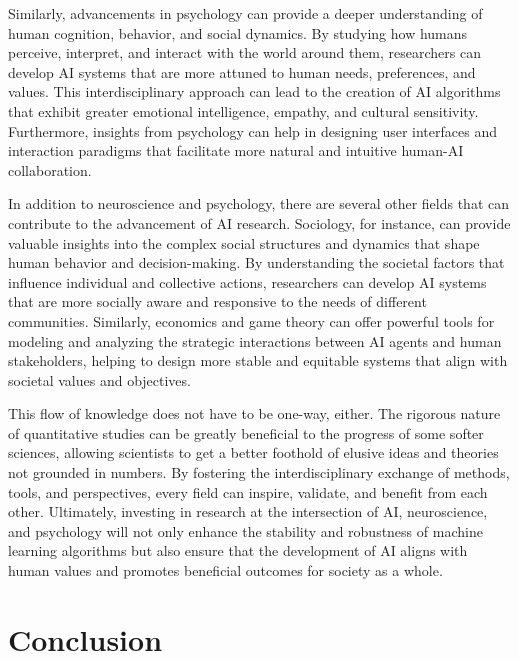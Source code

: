 \documentclass[10pt]{article}
\begin{document}
    Similarly, advancements in psychology can provide a deeper understanding of human cognition, behavior, and social dynamics. By studying how humans perceive, interpret, and interact with the world around them, researchers can develop AI systems that are more attuned to human needs, preferences, and values. This interdisciplinary approach can lead to the creation of AI algorithms that exhibit greater emotional intelligence, empathy, and cultural sensitivity. Furthermore, insights from psychology can help in designing user interfaces and interaction paradigms that facilitate more natural and intuitive human-AI collaboration.

    In addition to neuroscience and psychology, there are several other fields that can contribute to the advancement of AI research. Sociology, for instance, can provide valuable insights into the complex social structures and dynamics that shape human behavior and decision-making. By understanding the societal factors that influence individual and collective actions, researchers can develop AI systems that are more socially aware and responsive to the needs of different communities. Similarly, economics and game theory can offer powerful tools for modeling and analyzing the strategic interactions between AI agents and human stakeholders, helping to design more stable and equitable systems that align with societal values and objectives.

    This flow of knowledge does not have to be one-way, either. The rigorous nature of quantitative studies can be greatly beneficial to the progress of some softer sciences, allowing scientists to get a better foothold of elusive ideas and theories not grounded in numbers. By fostering the interdisciplinary exchange of methods, tools, and perspectives, every field can inspire, validate, and benefit from each other. Ultimately, investing in research at the intersection of AI, neuroscience, and psychology will not only enhance the stability and robustness of machine learning algorithms but also ensure that the development of AI aligns with human values and promotes beneficial outcomes for society as a whole. 

\section{Conclusion}

\pagebreak



\end{document}
